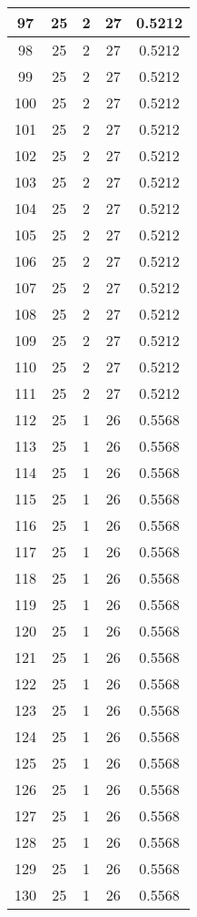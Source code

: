\documentclass[letterpaper, 12pt]{article}
\begin{document}
\begin{longtable}{|c|c|c|c|c|}
\hline
97 & 25 & 2 & 27 & 0.5212 \\
\hline
98 & 25 & 2 & 27 & 0.5212 \\
\hline
99 & 25 & 2 & 27 & 0.5212 \\
\hline
100 & 25 & 2 & 27 & 0.5212 \\
\hline
101 & 25 & 2 & 27 & 0.5212 \\
\hline
102 & 25 & 2 & 27 & 0.5212 \\
\hline
103 & 25 & 2 & 27 & 0.5212 \\
\hline
104 & 25 & 2 & 27 & 0.5212 \\
\hline
105 & 25 & 2 & 27 & 0.5212 \\
\hline
106 & 25 & 2 & 27 & 0.5212 \\
\hline
107 & 25 & 2 & 27 & 0.5212 \\
\hline
108 & 25 & 2 & 27 & 0.5212 \\
\hline
109 & 25 & 2 & 27 & 0.5212 \\
\hline
110 & 25 & 2 & 27 & 0.5212 \\
\hline
111 & 25 & 2 & 27 & 0.5212 \\
\hline
112 & 25 & 1 & 26 & 0.5568 \\
\hline
113 & 25 & 1 & 26 & 0.5568 \\
\hline
114 & 25 & 1 & 26 & 0.5568 \\
\hline
115 & 25 & 1 & 26 & 0.5568 \\
\hline
116 & 25 & 1 & 26 & 0.5568 \\
\hline
117 & 25 & 1 & 26 & 0.5568 \\
\hline
118 & 25 & 1 & 26 & 0.5568 \\
\hline
119 & 25 & 1 & 26 & 0.5568 \\
\hline
120 & 25 & 1 & 26 & 0.5568 \\
\hline
121 & 25 & 1 & 26 & 0.5568 \\
\hline
122 & 25 & 1 & 26 & 0.5568 \\
\hline
123 & 25 & 1 & 26 & 0.5568 \\
\hline
124 & 25 & 1 & 26 & 0.5568 \\
\hline
125 & 25 & 1 & 26 & 0.5568 \\
\hline
126 & 25 & 1 & 26 & 0.5568 \\
\hline
127 & 25 & 1 & 26 & 0.5568 \\
\hline
128 & 25 & 1 & 26 & 0.5568 \\
\hline
129 & 25 & 1 & 26 & 0.5568 \\
\hline
130 & 25 & 1 & 26 & 0.5568 \\

\end{longtable}
\end{document}
